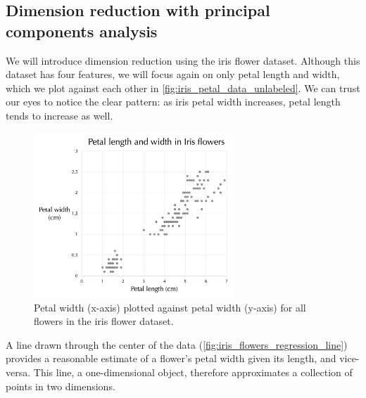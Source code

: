 \FloatBarrier
{}
\subsection{Dimension reduction with principal components analysis}

We will introduce dimension reduction using the iris flower dataset. Although this dataset has four features, we will focus again on only petal length and width, which we plot against each other in \autoref{fig:iris_petal_data_unlabeled}. We can trust our eyes to notice the clear pattern: as iris petal width increases, petal length tends to increase as well.\\

\begin{figure}[h]
\centering
\mySfFamily
\includegraphics[width = 0.67\textwidth]{../images/iris_petal_data_unlabeled.png}
\caption{Petal width (x-axis) plotted against petal width (y-axis) for all flowers in the iris flower dataset.}
\label{fig:iris_petal_data_unlabeled}
\end{figure}

A line drawn through the center of the data (\autoref{fig:iris_flowers_regression_line}) provides a reasonable estimate of a flower's petal width given its length, and vice-versa. This line, a one-dimensional object, therefore approximates a collection of points in two dimensions.\\

